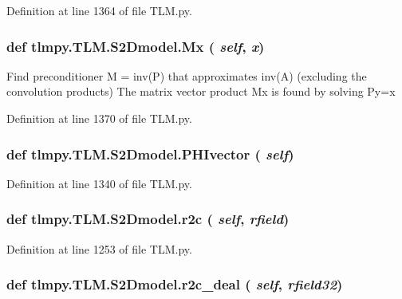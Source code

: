 Definition at line 1364 of file TLM.py.\hypertarget{classtlmpy_1_1TLM_1_1S2Dmodel_a31adfd5470ce3465a2f68a1891d45aa3}{
\subsubsection[{Mx}]{\setlength{\rightskip}{0pt plus 5cm}def tlmpy.TLM.S2Dmodel.Mx ( {\em self}, \/   {\em x})}}
\label{classtlmpy_1_1TLM_1_1S2Dmodel_a31adfd5470ce3465a2f68a1891d45aa3}
\begin{DoxyVerb}
Find preconditioner M = inv(P) that approximates inv(A)
(excluding the convolution products)
The matrix vector product Mx is found by solving Py=x
\end{DoxyVerb}
 

Definition at line 1370 of file TLM.py.\hypertarget{classtlmpy_1_1TLM_1_1S2Dmodel_af4fcba5a6fdc1de7bec38f2640a9e345}{
\subsubsection[{PHIvector}]{\setlength{\rightskip}{0pt plus 5cm}def tlmpy.TLM.S2Dmodel.PHIvector ( {\em self})}}
\label{classtlmpy_1_1TLM_1_1S2Dmodel_af4fcba5a6fdc1de7bec38f2640a9e345}


Definition at line 1340 of file TLM.py.\hypertarget{classtlmpy_1_1TLM_1_1S2Dmodel_aeb9de3fa59c4fe14ff286e7c3ef0908b}{
\subsubsection[{r2c}]{\setlength{\rightskip}{0pt plus 5cm}def tlmpy.TLM.S2Dmodel.r2c ( {\em self}, \/   {\em rfield})}}
\label{classtlmpy_1_1TLM_1_1S2Dmodel_aeb9de3fa59c4fe14ff286e7c3ef0908b}


Definition at line 1253 of file TLM.py.\hypertarget{classtlmpy_1_1TLM_1_1S2Dmodel_aa47bde8e3d6b0673cbf362853c4eefe4}{
\subsubsection[{r2c\_\-deal}]{\setlength{\rightskip}{0pt plus 5cm}def tlmpy.TLM.S2Dmodel.r2c\_\-deal ( {\em self}, \/   {\em rfield32})}}
\label{classtlmpy_1_1TLM_1_1S2Dmodel_aa47bde8e3d6b0673cbf362853c4eefe4}


